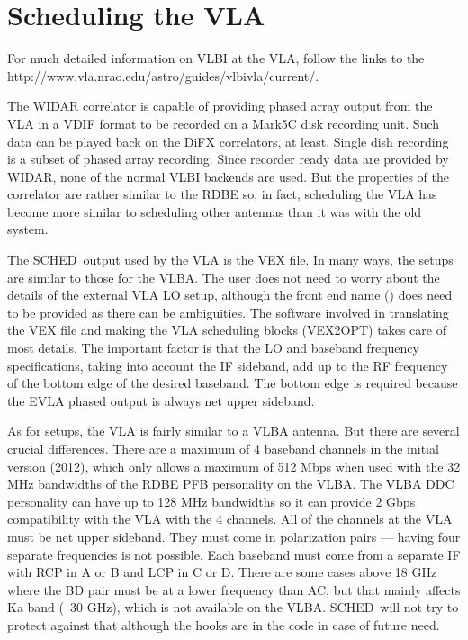 \documentclass{report}
\newcommand{\schedb}{{\sc SCHED~}}
\begin{document}
\section{\label{SEC:VLA}Scheduling the VLA}

For much detailed information on VLBI at the VLA, follow the links to
the 
{http://www.vla.nrao.edu/astro/guides/vlbivla/current/}.

The WIDAR correlator is capable of providing phased array output from
the VLA in a VDIF format to be recorded on a Mark5C disk recording 
unit.  Such data can be played back on the DiFX correlators, at least.
Single dish recording is a subset of phased array recording.  Since
recorder ready data are provided by WIDAR, none of the normal VLBI
backends are used.  But the properties of the correlator are rather 
similar to the RDBE so, in fact, scheduling the VLA has become more
similar to scheduling other antennas than it was with the old system.

The \schedb output used by the VLA is the VEX file.  In many ways, the
setups are similar to those for the VLBA.  The user does not need to
worry about the details of the external VLA LO setup, although the front
end name () does need to be provided as there
can be ambiguities.  The software involved in translating the VEX file
and making the VLA scheduling blocks (VEX2OPT) takes care of most
details.  The important factor is that the LO and baseband frequency
specifications, taking into account the IF sideband, add up to the
RF frequency of the bottom edge of the desired baseband.  The bottom
edge is required because the EVLA phased output is always net upper
sideband.  

As for setups, the VLA is fairly similar to a VLBA antenna.  But there
are several crucial differences.  There are a maximum of 4 baseband
channels in the initial version (2012), which only allows a maximum of
512 Mbps when used with the 32 MHz bandwidths of the RDBE PFB
personality on the VLBA.  The VLBA DDC personality can have up to 128
MHz bandwidths so it can provide 2 Gbps compatibility with the VLA
with the 4 channels.  All of the channels at the VLA must be net upper
sideband.  They must come in polarization pairs --- having four
separate frequencies is not possible.  Each baseband must come from a
separate IF with RCP in A or B and LCP in C or D.  There are some
cases above 18 GHz where the BD pair must be at a lower frequency than
AC, but that mainly affects Ka band (~30 GHz), which is not available
on the VLBA.  \schedb will not try to protect against that although
the hooks are in the code in case of future need.
\end{document}
